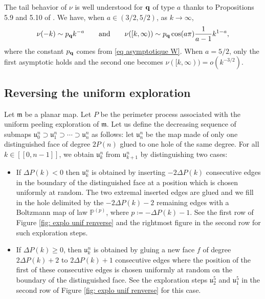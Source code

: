 \documentclass[11pt]{article}
\numberwithin{equation}{section}
\def\P{\mathbb{P}}
\def\lb{[\![}
\def\rb{]\!]}
\begin{document}
The tail behavior of $\nu$ is well understood for $\bf q$ of type $a$ thanks to Propositions 5.9 and 5.10 of \cite{StFlour}. We have, when $a \in (3/2,5/2)$, as $k\to \infty$,
\begin{equation}\label{queue nu}
\nu(-k) \sim p_{\bf q} k^{-a} \qquad \text{and} \qquad  \nu([k,\infty)) \sim p_{\bf q} \cos (a \pi )\frac{1}{a-1} k^{1-a},
\end{equation}
where the constant $p_{\bf q}$ comes from \eqref{eq asymptotique W}. When $a=5/2$, only the first asymptotic holds and the second one becomes $\nu([k,\infty))=o(k^{-3/2})$.




\subsection{Reversing the uniform exploration}\label{sous-section explo renversee}

Let $\mathfrak{m} $ be a planar map. Let $P$ be the perimeter process associated with the uniform peeling exploration of $\mathfrak{m}$. Let us define the decreasing sequence of submaps $\mathfrak{u}^n_0\supset \mathfrak{u}^n_1 \supset \cdots \supset \mathfrak{u}^n_n$ as follows: let $\mathfrak{u}^n_n$ be the map made of only one distinguished face of degree $2P(n)$ glued to one hole of the same degree. For all $k \in \lb 0,n-1 \rb $, we obtain $\mathfrak{u}^n_k$ from $\mathfrak{u}^n_{k+1}$ by distinguishing two cases:
\begin{itemize}
	\item If $\Delta P(k)  <0$ then $\mathfrak{u}^n_k$ is obtained by inserting $-2 \Delta P(k) $ consecutive edges in the boundary of the distinguished face at a position which is chosen uniformly at random. The two extremal inserted edges are glued and we fill in the hole delimited by the $-2 \Delta P(k) -2 $ remaining edges with a Boltzmann map of law $\P^{(p)}$, where $p\coloneqq -\Delta P(k)-1$. See the first row of Figure \ref{fig: explo unif renverse} and the rightmost figure in the second row for such exploration steps.
	\item If $\Delta P(k)  \ge 0$, then $\mathfrak{u}^n_k$ is obtained by gluing a new face $f$ of degree $2\Delta P(k)+2$ to $2\Delta P(k)+1$ consecutive edges where the position of the first of these consecutive edges is chosen uniformly at random on the boundary of the distinguished face. See the exploration steps $\mathfrak{u}^5_2$ and $\mathfrak{u}^5_1$ in the second row of Figure \ref{fig: explo unif renverse} for this case.
\end{itemize}
\end{document}

